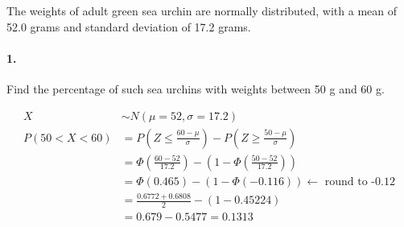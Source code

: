 


\renewcommand\assignment{Worksheet 15, Due February 27, 4:15pm}


    \iffalse
    \begin{equation*}
        \begin{gathered}
            Equations go here.
        \end{gathered}
    \end{equation*}

    \resizebox{\hsize}{!}{$Long equation goes here$}

    \begin{multicol*}{# of columns}
    \end{multicol*}

    \horizontal

    \fi


    The weights of adult green sea urchin are normally distributed, with a mean of 52.0 grams and standard deviation of 17.2 grams.

    \paragraph*{1.}
    Find the percentage of such sea urchins with weights between 50 g and 60 g.
    \\
    \begin{mdframed}
        \begin{align*}
            X               & \sim N(\mu=52, \sigma=17.2)           \\
            P(50 < X < 60)  & =  P\left(Z \leq \frac{60-\mu}{\sigma}\right) - P\left(Z \geq \frac{50-\mu}{\sigma}\right)    \\
                            & = \Phi\left(\frac{60-52}{17.2}\right) - \left( 1 - \Phi\left(\frac{50-52}{17.2}\right)\right)  \\
                            & = \Phi(0.465) - (1 - \Phi(-0.116)) \leftarrow \text{ round to -0.12} \\
                            & = \frac{0.6772+0.6808}{2} - (1 - 0.45224)                             \\
                            & = 0.679 - 0.5477 = \boxed{0.1313}
        \end{align*}
    \end{mdframed}

